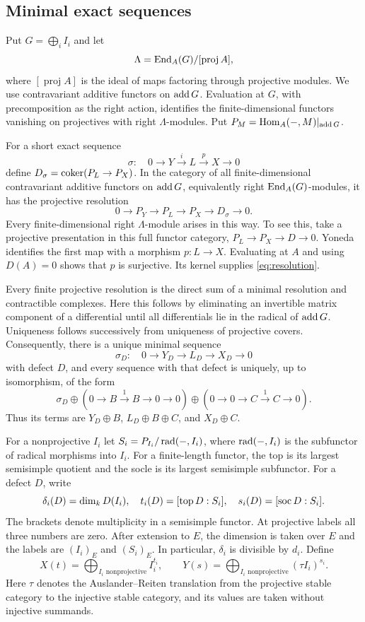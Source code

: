 \subsection{Minimal exact sequences}
Put $G=\bigoplus_iI_i$ and let
\[
 \Lambda=\operatorname{End}_A(G)/[\operatorname{proj}A],
\]
where $[\operatorname{proj}A]$ is the ideal of maps factoring through projective modules. We use contravariant additive functors on $\operatorname{add} G$. Evaluation at $G$, with precomposition as the right action, identifies the finite-dimensional functors vanishing on projectives with right $\Lambda$-modules. Put $P_M=\operatorname{Hom}_A(-,M)|_{\operatorname{add} G}$.

For a short exact sequence
\[
 \sigma:\quad 0\longrightarrow Y\xrightarrow{i}L\xrightarrow{p}X\longrightarrow0
\]
define $D_\sigma=\operatorname{coker}(P_L\to P_X)$. In the category of all finite-dimensional contravariant additive functors on $\operatorname{add} G$, equivalently right $\operatorname{End}_A(G)$-modules, it has the projective resolution
\begin{equation}\label{eq:resolution}
 0\longrightarrow P_Y\longrightarrow P_L\longrightarrow P_X
 \longrightarrow D_\sigma\longrightarrow0.
\end{equation}
Every finite-dimensional right $\Lambda$-module arises in this way. To see this, take a projective presentation in this full functor category, $P_L\to P_X\to D\to0$. Yoneda identifies the first map with a morphism $p:L\to X$. Evaluating at $A$ and using $D(A)=0$ shows that $p$ is surjective. Its kernel supplies \eqref{eq:resolution}.

Every finite projective resolution is the direct sum of a minimal resolution and contractible complexes. Here this follows by eliminating an invertible matrix component of a differential until all differentials lie in the radical of $\operatorname{add} G$. Uniqueness follows successively from uniqueness of projective covers. Consequently, there is a unique minimal sequence
\[
 \sigma_D:\quad 0\to Y_D\to L_D\to X_D\to0
\]
with defect $D$, and every sequence with that defect is uniquely, up to isomorphism, of the form
\begin{equation}\label{eq:contracts}
 \sigma_D\oplus(0\to B\xrightarrow{1}B\to0\to0)
 \oplus(0\to0\to C\xrightarrow{1}C\to0).
\end{equation}
Thus its terms are $Y_D\oplus B$, $L_D\oplus B\oplus C$, and $X_D\oplus C$.

For a nonprojective $I_i$ let $S_i=P_{I_i}/\operatorname{rad}(-,I_i)$, where $\operatorname{rad}(-,I_i)$ is the subfunctor of radical morphisms into $I_i$. For a finite-length functor, the top is its largest semisimple quotient and the socle is its largest semisimple subfunctor. For a defect $D$, write
\[
 \delta_i(D)=\dim_kD(I_i),\quad
 t_i(D)=[\operatorname{top} D:S_i],\quad s_i(D)=[\operatorname{soc} D:S_i].
\]
The brackets denote multiplicity in a semisimple functor. At projective labels all three numbers are zero. After extension to $E$, the dimension is taken over $E$ and the labels are $(I_i)_E$ and $(S_i)_E$. In particular, $\delta_i$ is divisible by $d_i$. Define
\[
 X(t)=\bigoplus_{I_i\text{ nonprojective}}I_i^{t_i},\qquad
 Y(s)=\bigoplus_{I_i\text{ nonprojective}}(\tau I_i)^{s_i}.
\]
Here $\tau$ denotes the Auslander--Reiten translation from the projective stable category to the injective stable category, and its values are taken without injective summands.

